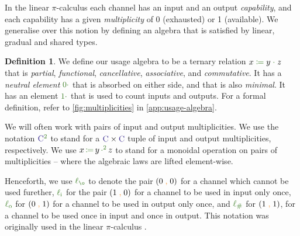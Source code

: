 \documentclass[a4paper,UKenglish,cleveref,autoref,thm-restate,authorcolumns]{lipics-v2019}
\theoremstyle{definition}
\newtheorem{nidefinition}[theorem]{Definition}
\newcommand{\picalc}{$\pi$-calculus}
\newcommand{\type}[1]{\textcolor{BlueViolet}{\operatorname{#1}}}
\newcommand{\constr}[1]{\textcolor{BurntOrange}{\operatorname{#1}}}
\newcommand{\func}[1]{\textcolor{OliveGreen}{\operatorname{#1}}}
\newcommand{\comma}{\; \constr{,} \;}
\newcommand{\op}[3]{#1 \; \func{\coloneqq} \; #2 \; \func{\cdot} \; #3}
\newcommand{\opsquared}[3]{#1 \, \func{\coloneqq} \, #2 \, \func{\cdot^2} \, #3}
\newcommand{\zero}{\func{0\cdot}}
\newcommand{\one}{\func{1\cdot}}
\newcommand{\li}{\func{\ell_i}}
\newcommand{\lo}{\func{\ell_o}}
\newcommand{\lz}{\func{\ell_{\o}}}
\newcommand{\lio}{\func{\ell_{\#}}}
\begin{document}
In the linear \picalc{} each channel has an input and an output \emph{capability}, and each capability has a given \emph{multiplicity} of 0 (exhausted) or 1 (available).
We generalise over this notion by defining an algebra that is satisfied by linear, gradual and shared types.

\begin{nidefinition}
  We define our usage algebra to be a ternary relation $\op{x}{y}{z}$ that is \emph{partial}, \emph{functional}, \emph{cancellative}, \emph{associative}, and \emph{commutative}.
  It has a \emph{neutral element} $\zero$ that is absorbed on either side, and that is also \emph{minimal}.
  It has an element $\one$ that is used to count inputs and outputs.
  For a formal definition, refer to \autoref{fig:multiplicities} in \autoref{app:usage-algebra}.
\end{nidefinition}

\begin{note}
  \label{note:linearity}
  We will often work with pairs of input and output multiplicities.
  We use the notation $\type{C}^{\func{2}}$ to stand for a $\type{C} \times \type{C}$ tuple of input and output multiplicities, respectively.
  We use $\opsquared{x}{y}{z}$ to stand for a monoidal operation on pairs of multiplicities -- where the algebraic laws are lifted element-wise.

  Henceforth, we use $\lz$ to denote the pair $(0 \comma 0)$ for a channel which cannot be used furether, $\li$ for the pair $(1 \comma 0)$ for a channel to be used in input only once, $\lo$ for $(0 \comma 1)$ for a channel to be used in output only once, and $\lio$ for $(1 \comma 1)$, for a channel to be used once in input and once in output. This notation was originally used in the linear \picalc{} \cite{KPT96,Sangio01}.
\end{note}
\end{document}
